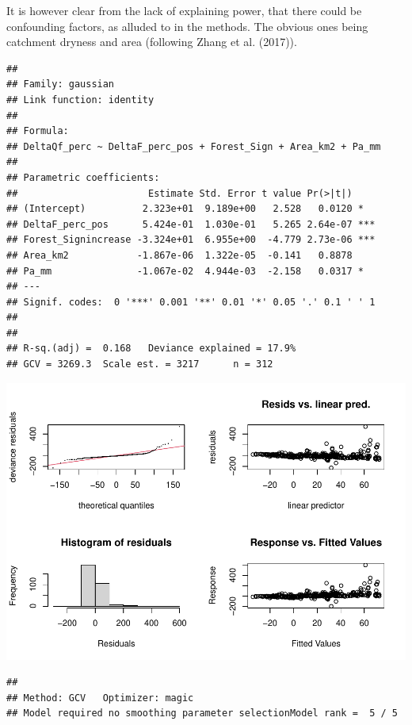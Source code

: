 \documentclass[]{elsarticle} %
\begin{document}
It is however clear from the lack of explaining power, that there could
be confounding factors, as alluded to in the methods. The obvious ones
being catchment dryness and area (following Zhang et al. (2017)).

\begin{verbatim}
## 
## Family: gaussian 
## Link function: identity 
## 
## Formula:
## DeltaQf_perc ~ DeltaF_perc_pos + Forest_Sign + Area_km2 + Pa_mm
## 
## Parametric coefficients:
##                       Estimate Std. Error t value Pr(>|t|)    
## (Intercept)          2.323e+01  9.189e+00   2.528   0.0120 *  
## DeltaF_perc_pos      5.424e-01  1.030e-01   5.265 2.64e-07 ***
## Forest_Signincrease -3.324e+01  6.955e+00  -4.779 2.73e-06 ***
## Area_km2            -1.867e-06  1.322e-05  -0.141   0.8878    
## Pa_mm               -1.067e-02  4.944e-03  -2.158   0.0317 *  
## ---
## Signif. codes:  0 '***' 0.001 '**' 0.01 '*' 0.05 '.' 0.1 ' ' 1
## 
## 
## R-sq.(adj) =  0.168   Deviance explained = 17.9%
## GCV = 3269.3  Scale est. = 3217      n = 312
\end{verbatim}

\includegraphics{Forest_and_Water_files/figure-latex/model2-1.pdf}

\begin{verbatim}
## 
## Method: GCV   Optimizer: magic
## Model required no smoothing parameter selectionModel rank =  5 / 5
\end{verbatim}
\end{document}
